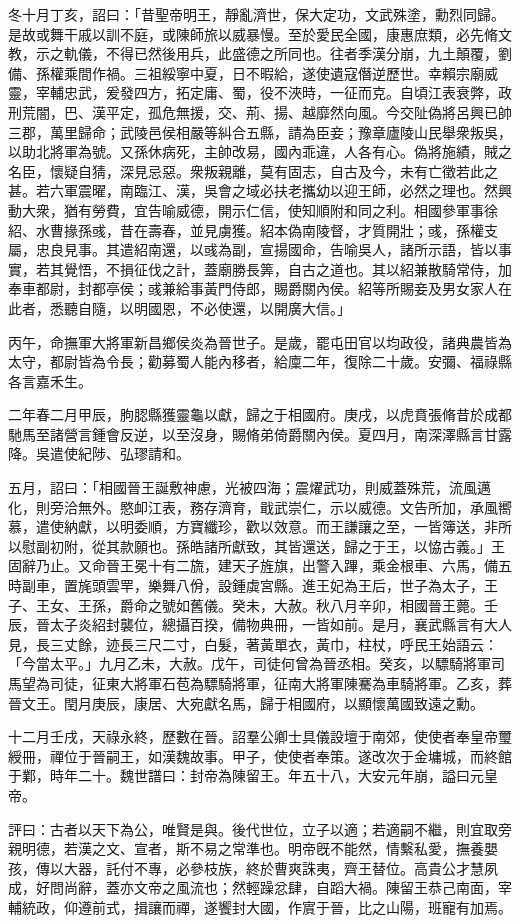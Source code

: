 \begin{pinyinscope}
冬十月丁亥，詔曰：「昔聖帝明王，靜亂濟世，保大定功，文武殊塗，勳烈同歸。是故或舞干戚以訓不庭，或陳師旅以威暴慢。至於愛民全國，康惠庶類，必先脩文教，示之軌儀，不得已然後用兵，此盛德之所同也。往者季漢分崩，九土顛覆，劉備、孫權乘間作禍。三祖綏寧中夏，日不暇給，遂使遺寇僭逆歷世。幸賴宗廟威靈，宰輔忠武，爰發四方，拓定庸、蜀，役不浹時，一征而克。自頃江表衰弊，政刑荒闇，巴、漢平定，孤危無援，交、荊、揚、越靡然向風。今交阯偽將呂興已帥三郡，萬里歸命；武陵邑侯相嚴等糾合五縣，請為臣妾；豫章廬陵山民舉衆叛吳，以助北將軍為號。又孫休病死，主帥改易，國內乖違，人各有心。偽將施績，賊之名臣，懷疑自猜，深見忌惡。衆叛親離，莫有固志，自古及今，未有亡徵若此之甚。若六軍震曜，南臨江、漢，吳會之域必扶老攜幼以迎王師，必然之理也。然興動大衆，猶有勞費，宜告喻威德，開示仁信，使知順附和同之利。相國參軍事徐紹、水曹掾孫彧，昔在壽春，並見虜獲。紹本偽南陵督，才質開壯；彧，孫權支屬，忠良見事。其遣紹南還，以彧為副，宣揚國命，告喻吳人，諸所示語，皆以事實，若其覺悟，不損征伐之計，蓋廟勝長筭，自古之道也。其以紹兼散騎常侍，加奉車都尉，封都亭侯；彧兼給事黃門侍郎，賜爵關內侯。紹等所賜妾及男女家人在此者，悉聽自隨，以明國恩，不必使還，以開廣大信。」

丙午，命撫軍大將軍新昌鄉侯炎為晉世子。是歲，罷屯田官以均政役，諸典農皆為太守，都尉皆為令長；勸募蜀人能內移者，給廩二年，復除二十歲。安彌、福祿縣各言嘉禾生。

二年春二月甲辰，朐䏰縣獲靈龜以獻，歸之于相國府。庚戌，以虎賁張脩昔於成都馳馬至諸營言鍾會反逆，以至沒身，賜脩弟倚爵關內侯。夏四月，南深澤縣言甘露降。吳遣使紀陟、弘璆請和。

五月，詔曰：「相國晉王誕敷神慮，光被四海；震燿武功，則威蓋殊荒，流風邁化，則旁洽無外。愍卹江表，務存濟育，戢武崇仁，示以威德。文告所加，承風嚮慕，遣使納獻，以明委順，方寶纖珍，歡以效意。而王謙讓之至，一皆簿送，非所以慰副初附，從其款願也。孫皓諸所獻致，其皆還送，歸之于王，以恊古義。」王固辭乃止。又命晉王冕十有二旒，建天子旌旗，出警入蹕，乘金根車、六馬，備五時副車，置旄頭雲䍐，樂舞八佾，設鍾虡宮縣。進王妃為王后，世子為太子，王子、王女、王孫，爵命之號如舊儀。癸未，大赦。秋八月辛卯，相國晉王薨。壬辰，晉太子炎紹封襲位，總攝百揆，備物典冊，一皆如前。是月，襄武縣言有大人見，長三丈餘，迹長三尺二寸，白髮，著黃單衣，黃巾，柱杖，呼民王始語云：「今當太平。」九月乙未，大赦。戊午，司徒何曾為晉丞相。癸亥，以驃騎將軍司馬望為司徒，征東大將軍石苞為驃騎將軍，征南大將軍陳騫為車騎將軍。乙亥，葬晉文王。閏月庚辰，康居、大宛獻名馬，歸于相國府，以顯懷萬國致遠之勳。

十二月壬戌，天祿永終，歷數在晉。詔羣公卿士具儀設壇于南郊，使使者奉皇帝璽綬冊，禪位于晉嗣王，如漢魏故事。甲子，使使者奉策。遂改次于金墉城，而終館于鄴，時年二十。魏世譜曰：封帝為陳留王。年五十八，大安元年崩，謚曰元皇帝。

評曰：古者以天下為公，唯賢是與。後代世位，立子以適；若適嗣不繼，則宜取旁親明德，若漢之文、宣者，斯不易之常準也。明帝旣不能然，情繫私愛，撫養嬰孩，傳以大器，託付不專，必參枝族，終於曹爽誅夷，齊王替位。高貴公才慧夙成，好問尚辭，蓋亦文帝之風流也；然輕躁忿肆，自蹈大禍。陳留王恭己南面，宰輔統政，仰遵前式，揖讓而禪，遂饗封大國，作賔于晉，比之山陽，班寵有加焉。


\end{pinyinscope}